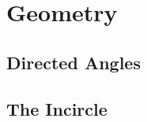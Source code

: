 \chapter{Geometry}
\section{Directed Angles}\label{n:g:directed}
\section{The Incircle}\label{n:g:incircle}
